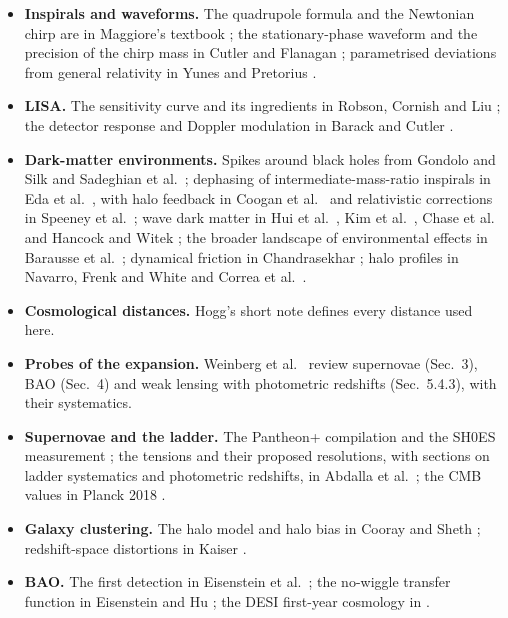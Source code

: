 \begin{itemize}[leftmargin=1.2em,itemsep=2pt]
  \item \textbf{Inspirals and waveforms.} The quadrupole formula and the Newtonian chirp are in Maggiore's textbook \cite{Maggiore2007}; the stationary-phase waveform and the precision of the chirp mass in Cutler and Flanagan \cite{CutlerFlanagan1994}; parametrised deviations from general relativity in Yunes and Pretorius \cite{YunesPretorius2009}.
  \item \textbf{LISA.} The sensitivity curve and its ingredients in Robson, Cornish and Liu \cite{Robson2019}; the detector response and Doppler modulation in Barack and Cutler \cite{BarackCutler2004}.
  \item \textbf{Dark-matter environments.} Spikes around black holes from Gondolo and Silk \cite{GondoloSilk1999} and Sadeghian et al.\ \cite{Sadeghian2013}; dephasing of intermediate-mass-ratio inspirals in Eda et al.\ \cite{Eda2015}, with halo feedback in Coogan et al.\ \cite{Coogan2022} and relativistic corrections in Speeney et al.\ \cite{Speeney2022}; wave dark matter in Hui et al.\ \cite{HuiOstriker2017,HuiKabat2019}, Kim et al.\ \cite{Kim2023}, Chase et al.\ \cite{Chase2025} and Hancock and Witek \cite{HancockWitek2025}; the broader landscape of environmental effects in Barausse et al.\ \cite{Barausse2014}; dynamical friction in Chandrasekhar \cite{Chandrasekhar1943}; halo profiles in Navarro, Frenk and White \cite{NFW1996,NFW1997} and Correa et al.\ \cite{Correa2015}.
  \item \textbf{Cosmological distances.} Hogg's short note \cite{Hogg1999} defines every distance used here.
  \item \textbf{Probes of the expansion.} Weinberg et al.\ \cite{Weinberg2013} review supernovae (Sec.~3), BAO (Sec.~4) and weak lensing with photometric redshifts (Sec.~5.4.3), with their systematics.
  \item \textbf{Supernovae and the ladder.} The Pantheon+ compilation \cite{Brout2022PantheonPlus} and the SH0ES measurement \cite{Riess2022SH0ES}; the tensions and their proposed resolutions, with sections on ladder systematics and photometric redshifts, in Abdalla et al.\ \cite{Abdalla2022}; the CMB values in Planck 2018 \cite{Planck2018VI}.
  \item \textbf{Galaxy clustering.} The halo model and halo bias in Cooray and Sheth \cite{CooraySheth2002}; redshift-space distortions in Kaiser \cite{Kaiser1987}.
  \item \textbf{BAO.} The first detection in Eisenstein et al.\ \cite{Eisenstein2005}; the no-wiggle transfer function in Eisenstein and Hu \cite{EisensteinHu1998}; the DESI first-year cosmology in \cite{DESI2024VI}.
\end{itemize}
  